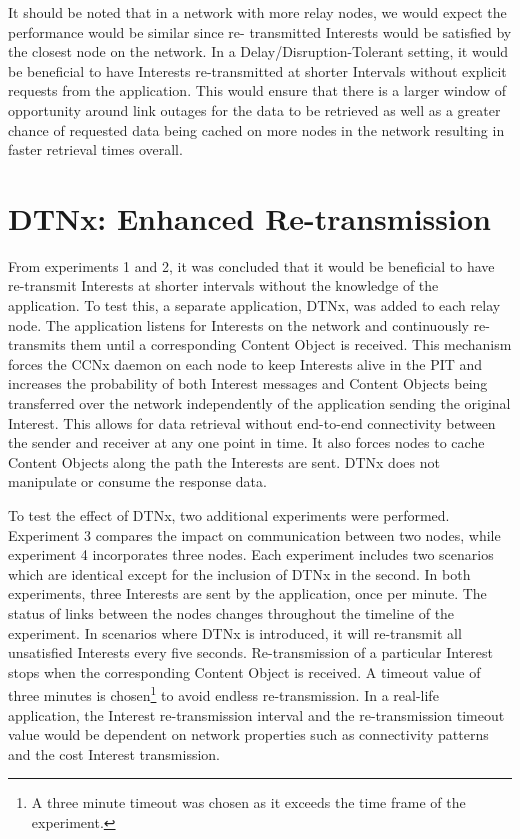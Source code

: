 \documentclass[a4paper,12pt]{report}      %
\begin{document}
It should be noted that in a network with more relay nodes, we would expect the performance would be similar since re-
transmitted Interests would be satisfied by the closest node on the network. In a Delay/Disruption-Tolerant setting,
it would be beneficial to have Interests re-transmitted at shorter Intervals without explicit requests from
the application. This would ensure that there is a larger window of opportunity around link outages for
the data to be retrieved as well as a greater chance of requested data being cached on more nodes in the
network resulting in faster retrieval times overall.


\pagebreak
\section{DTNx: Enhanced Re-transmission}

From experiments 1 and 2, it was concluded that it would be beneficial to have re-transmit Interests at
shorter intervals without the knowledge of the application. To test this, a separate application, DTNx,
was added to each relay node. The application listens for Interests on the network and continuously re-transmits them until
a corresponding Content Object is received. This mechanism forces the CCNx daemon on each node to keep Interests alive in the PIT 
and increases the probability of both Interest messages and Content Objects being transferred over the network independently of the application sending the original Interest. This allows for data retrieval without end-to-end connectivity between the sender and receiver at any one point in time. It also forces nodes to cache Content Objects along the path the Interests  are sent. DTNx does not manipulate or consume the response data.

To test the effect of DTNx, two additional experiments were performed. Experiment 3 compares the
impact on communication between two nodes, while experiment 4 incorporates three nodes. Each
experiment includes two scenarios which are identical except for the inclusion of DTNx in the second.
In both experiments, three Interests are sent by the application, once per minute. The status of links
between the nodes changes throughout the timeline of the experiment. In scenarios where DTNx is
introduced, it will re-transmit all unsatisfied Interests every five seconds. Re-transmission of a particular
Interest stops when the corresponding Content Object is received. A timeout value of 
three minutes is chosen\footnote{A three minute timeout was chosen as it exceeds the time frame of the experiment.} to avoid endless re-transmission. In a real-life application, the Interest re-transmission interval and the re-transmission timeout value would be dependent on network properties such as connectivity patterns and the cost Interest transmission.
\end{document}
